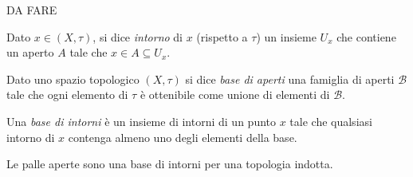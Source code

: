 \begin{es}
	DA FARE
\end{es}

\begin{defn}[Intorno]
	Dato $x \in (X,\tau)$,
	si dice \emph{intorno} di $x$ (rispetto a $\tau$)
	un insieme $U_x$ che contiene un aperto $A$ tale che $x \in A \subseteq U_x$.
\end{defn}

\begin{defn}
	Dato uno spazio topologico $(X,\tau)$
	si dice \emph{base di aperti} una famiglia di aperti $\mathcal B$
	tale che ogni elemento di $\tau$ è ottenibile come unione di elementi di $\mathcal B$.
\end{defn}

\begin{defn}
	Una \emph{base di intorni} è un insieme di intorni di un punto $x$
	tale che qualsiasi intorno di $x$ contenga almeno uno degli elementi della base.
\end{defn}

\begin{oss}
	Le palle aperte sono una base di intorni per una topologia indotta.
\end{oss}
